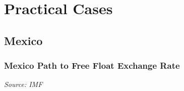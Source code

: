 \documentclass{beamer}
\begin{document}
\section{Practical Cases}

\subsection{Mexico}

\begin{frame}
  \frametitle{Mexico Path to Free Float Exchange Rate}
  \medskip
  \emph{Source: IMF \href{https://www.elibrary.imf.org/display/book/9781484375686/ch010.xml}{}}
\end{frame}
\end{document}
